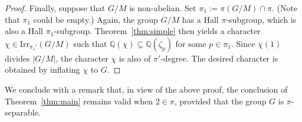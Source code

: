\documentclass[12pt]{amsart}
\theoremstyle{definition}
\numberwithin{equation}{section}
\newcommand{\Irr}{{\mathrm {Irr}}}
\newcommand{\QQ}{{\mathbb Q}}
\begin{document}
\begin{proof}
Finally, suppose that $G/M$ is non-abelian. Set $\pi_1 := \pi(G/M)
\cap \pi$. (Note that $\pi_1$ could be empty.) Again, the group
$G/M$ has a Hall $\pi$-subgroup, which is also a Hall
$\pi_1$-subgroup. Theorem~\ref{thm:simple} then yields a character
$\chi \in \Irr_{\pi_1'}(G/M)$ such that $\QQ(\chi) \subseteq
\QQ(\zeta_p)$ for some $p \in \pi_1$. Since $\chi(1)$ divides
$|G/M|$, the character $\chi$ is also of $\pi'$-degree. The desired
character is obtained by inflating $\chi$ to $G$.
\end{proof}

We conclude with a remark that, in view of the above proof, the
conclusion of Theorem~\ref{thm:main} remains valid when $2 \in \pi$,
provided that the group $G$ is $\pi$-separable.

\end{document}
